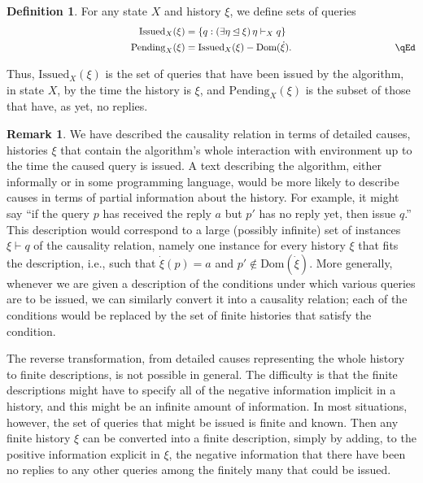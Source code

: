 \documentclass{LMCS}
\theoremstyle{definition}
\newtheorem{df}[thm]{Definition}
\newtheorem{rmk}[thm]{Remark}
\newcommand{\ans}{\dot}
\newcommand{\dom}[1]{\ensuremath{{\text{Dom}}(#1)}}
\newcommand{\Issued}{\text{Issued}}
\newcommand{\initeq}{\unlhd}
\begin{document}
\begin{df}
 For any state $X$ and history $\xi$, we define sets of queries
 \begin{align*}
   \Issued_X(\xi)&=
   \{q:(\exists\eta\initeq\xi)\,\eta\vdash_Xq\}\\
   \hbox to 127 pt{\hfill}
   \text{Pending}_X(\xi)&=\Issued_X(\xi)-\dom{\ans\xi}.
   \hbox to 127 pt{\hfill\qEd}
 \end{align*}\end{df}

Thus, $\Issued_X(\xi)$ is the set of queries that have been
issued by the algorithm, in state $X$, by the time the history is
$\xi$, and $\text{Pending}_X(\xi)$ is the subset of those that have,
as yet, no replies.

\begin{rmk}   \label{descr-causes}
  We have described the causality relation in terms of detailed
  causes, histories $\xi$ that contain the algorithm's whole
  interaction with environment up to the time the caused query is
  issued.  A text describing the algorithm, either informally or in
  some programming language, would be more likely to describe causes
  in terms of partial information about the history.  For example, it
  might say ``if the query $p$ has received the reply $a$ but $p'$ has
  no reply yet, then issue $q$.''  This description would correspond
  to a large (possibly infinite) set of instances $\xi\vdash q$ of the
  causality relation, namely one instance for every history $\xi$ that
  fits the description, i.e., such that $\dot\xi(p)=a$ and
  $p'\notin\dom{\dot\xi}$.  More generally, whenever we are given a
  description of the conditions under which various queries are to be
  issued, we can similarly convert it into a causality relation; each
  of the conditions would be replaced by the set of finite histories
  that satisfy the condition.

The reverse transformation, from detailed causes representing the
whole history to finite descriptions, is not possible in general.  The
difficulty is that the finite descriptions might have to specify all
of the negative information implicit in a history, and this might be
an infinite amount of information.  In most situations, however, the
set of queries that might be issued is finite and known.  Then any
finite history $\xi$ can be converted into a finite description,
simply by adding, to the positive information explicit in $\xi$, the
negative information that there have been no replies to any other
queries among the finitely many that could be issued.


\end{rmk}
\end{document}
